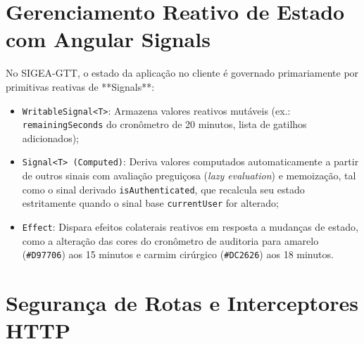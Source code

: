 \begin{figure}[!ht]
{
}
\end{figure}

\section{Gerenciamento Reativo de Estado com Angular Signals}
\label{sec_angular_signals}

No SIGEA-GTT, o estado da aplicação no cliente é governado primariamente por primitivas reativas de **Signals**:
\begin{itemize}
    \item \texttt{WritableSignal<T>}: Armazena valores reativos mutáveis (ex.: \texttt{remainingSeconds} do cronômetro de 20 minutos, lista de gatilhos adicionados);
    \item \texttt{Signal<T> (Computed)}: Deriva valores computados automaticamente a partir de outros sinais com avaliação preguiçosa (\textit{lazy evaluation}) e memoização, tal como o sinal derivado \texttt{isAuthenticated}, que recalcula seu estado estritamente quando o sinal base \texttt{currentUser} for alterado;
    \item \texttt{Effect}: Dispara efeitos colaterais reativos em resposta a mudanças de estado, como a alteração das cores do cronômetro de auditoria para amarelo (\texttt{\#D97706}) aos 15 minutos e carmim cirúrgico (\texttt{\#DC2626}) aos 18 minutos.
\end{itemize}

\section{Segurança de Rotas e Interceptores HTTP}
\label{sec_seguranca_rotas_frontend}


